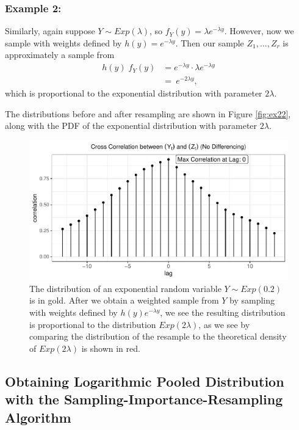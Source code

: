 \documentclass[12pt,twoside]{smiththesis}
\begin{document}
\hypertarget{example-2}{%
\subsubsection{Example 2:}\label{example-2}}

Similarly, again suppose \(Y \sim Exp(\lambda)\), so \(f_Y(y) = \lambda e^{-\lambda y}\). However, now we sample with weights defined by \(h(y)= e^{-\lambda y}\).
Then our sample \(Z_1,\dots,Z_r\) is approximately a sample from
\begin{align*} 
h(y) \; f_Y(y) &=   e^{-\lambda y} \cdot \lambda e^{-\lambda y}\\
&= \ e^{-2 \lambda y},  
\end{align*}
which is proportional to the exponential distribution with parameter \(2\lambda\).

The distributions before and after resampling are shown in Figure \ref{fig:ex22}, along with the PDF of the exponential distribution with parameter \(2\lambda\).
\begin{figure}

{\centering \includegraphics[width=1\linewidth]{thesis_files/figure-latex/unnamed-chunk-25-1} 

}

\caption{\label{fig:ex22}The distribution of an exponential random variable $Y \sim Exp(0.2)$ is in gold. After we obtain a weighted sample from $Y$ by sampling with weights defined by $h(y) e^{-\lambda y}$, we see the resulting distribution is proportional to the distribution $Exp(2\lambda)$, as we see by comparing the distribution of the resample to the theoretical density of  $Exp(2\lambda)$ is shown in red.}\label{fig:unnamed-chunk-25}
\end{figure}
\newpage

\hypertarget{logpooled}{%
\subsection{Obtaining Logarithmic Pooled Distribution with the Sampling-Importance-Resampling Algorithm}\label{logpooled}}
\end{document}
